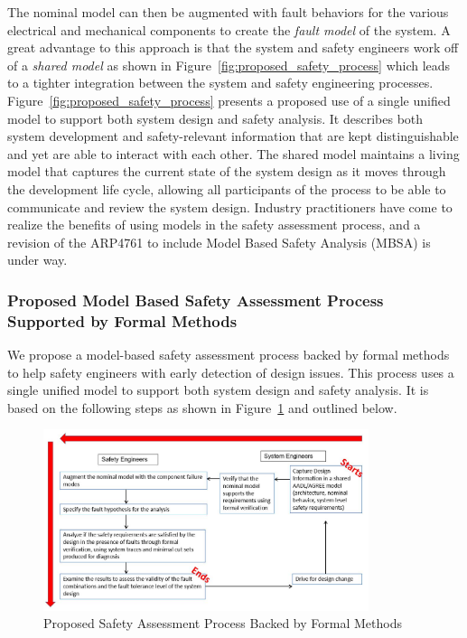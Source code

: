 The nominal model can then be augmented with fault behaviors for the various electrical and mechanical components to create the \emph{fault model} of the system. A great advantage to this approach is that the system and safety engineers work off of a \emph{shared model} as shown in Figure~\ref{fig:proposed_safety_process} which leads to a tighter integration between the system and safety engineering processes. Figure~\ref{fig:proposed_safety_process} presents a proposed use of a single unified model to support both system design and safety analysis. It describes both system development and safety-relevant information that are kept distinguishable and yet are able to interact with each other. The shared model maintains a living model that captures the current state of the system design as it moves through the development life cycle, allowing all participants of the process to be able to communicate and review the system design. Industry practitioners have come to realize the benefits of using models in the safety assessment process, and a revision of the ARP4761 to include Model Based Safety Analysis (MBSA) is under way. 

\subsubsection{Proposed Model Based Safety Assessment Process Supported by Formal Methods}
We propose a model-based safety assessment process backed by formal methods to help safety engineers with early detection of design issues.  This process uses a single unified model to support both system design and safety analysis. It is based on the following steps as shown in Figure~\ref{fig:updated_safety_process} and outlined below.

\begin{figure}[t!]
	\centering
	\includegraphics[width=0.85\textwidth]{images/process4.jpg}
	\caption{Proposed Safety Assessment Process Backed by Formal Methods}
	\label{fig:updated_safety_process}
\end{figure}

